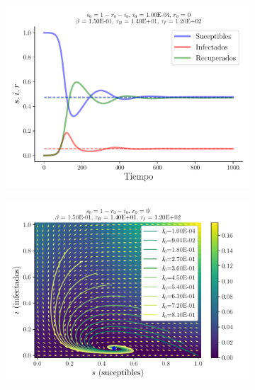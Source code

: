 \documentclass[twocolumn,aps,prl]{revtex4-1}
\begin{document}
\begin{figure}[ht!]
  \begin{subfigure}[b]{0.49\linewidth}
    \centering
      \centering
      \includegraphics[width = 1.05\textwidth]{figuras/ex01-a-sir.pdf}
      \caption{}
      \label{fig:ex01-a-sir}
  \end{subfigure}\quad
  \begin{subfigure}[b]{0.49\linewidth}
      \centering
      \includegraphics[width = 1.05\textwidth]{figuras/ex01-a-vector.pdf}
      \caption{}
      \label{fig:ex01-a-vector}
  \end{subfigure}\quad


\end{figure}
\end{document}
